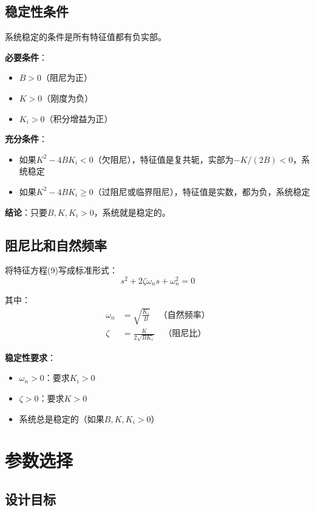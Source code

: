 \documentclass[12pt,a4paper]{article}
\begin{document}
\subsection{稳定性条件}

系统稳定的条件是所有特征值都有负实部。

\textbf{必要条件}：
\begin{itemize}
\item $B > 0$（阻尼为正）
\item $K > 0$（刚度为负）
\item $K_i > 0$（积分增益为正）
\end{itemize}

\textbf{充分条件}：
\begin{itemize}
\item 如果$K^2 - 4BK_i < 0$（欠阻尼），特征值是复共轭，实部为$-K/(2B) < 0$，系统稳定
\item 如果$K^2 - 4BK_i \geq 0$（过阻尼或临界阻尼），特征值是实数，都为负，系统稳定
\end{itemize}

\textbf{结论}：只要$B, K, K_i > 0$，系统就是稳定的。

\subsection{阻尼比和自然频率}

将特征方程(9)写成标准形式：
\begin{equation}
s^2 + 2\zeta\omega_n s + \omega_n^2 = 0
\end{equation}

其中：
\begin{align}
\omega_n &= \sqrt{\frac{K_i}{B}} \quad \text{（自然频率）} \tag{11} \\
\zeta &= \frac{K}{2\sqrt{BK_i}} \quad \text{（阻尼比）} \tag{12}
\end{align}

\textbf{稳定性要求}：
\begin{itemize}
\item $\omega_n > 0$：要求$K_i > 0$
\item $\zeta > 0$：要求$K > 0$
\item 系统总是稳定的（如果$B, K, K_i > 0$）
\end{itemize}

\section{参数选择}

\subsection{设计目标}
\end{document}
